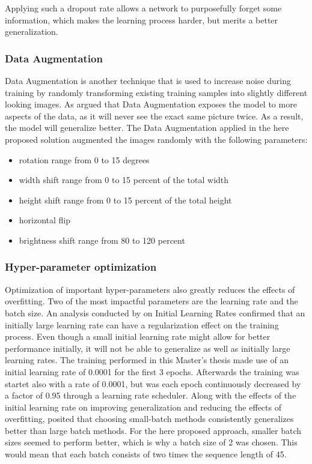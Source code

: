 Applying such a dropout rate allows a network to purposefully forget some information, which makes the learning process harder, but merits a better generalization.

\subsubsection{Data Augmentation}
Data Augmentation is another technique that is used to increase noise during training by randomly transforming existing training samples into slightly different looking images. As \citet{Chollet:2017:DeepLearningPython} argued that Data Augmentation exposes the model to more aspects of the data, as it will never see the exact same picture twice. As a result, the model will generalize better.
The Data Augmentation applied in the here proposed solution augmented the images randomly with the following parameters:

\begin{itemize}
    \item rotation range from 0 to 15 degrees
    \item width shift range from 0 to 15 percent of the total width
    \item height shift range from 0 to 15 percent of the total height
    \item horizontal flip
    \item brightness shift range from 80 to 120 percent
\end{itemize}

\subsubsection{Hyper-parameter optimization}
Optimization of important hyper-parameters also greatly reduces the effects of overfitting. Two of the most impactful parameters are the learning rate and the batch size.
\newline\newline
An analysis conducted by \citet{Yuanzhi:2019:RegularizationInitialLargeLearningRate} on Initial Learning Rates confirmed that an initially large learning rate can have a regularization effect on the training process. Even though a small initial learning rate might allow for better performance initially, it will not be able to generalize as well as initially large learning rates. The training performed in this Master's thesis made use of an initial learning rate of 0.0001 for the first 3 epochs. Afterwards the training was startet also with a rate of 0.0001, but was each epoch continuously decreased by a factor of 0.95 through a learning rate scheduler.
\newline\newline
Along with the effects of the initial learning rate on improving generalization and reducing the effects of overfitting, \citet{Keskar:2016:LargeBatchTrainingGeneralization} posited that choosing small-batch methods consistently generalizes better than large batch methods. For the here proposed approach, smaller batch sizes seemed to perform better, which is why a batch size of 2 was chosen. This would mean that each batch consists of two times the sequence length of 45.

